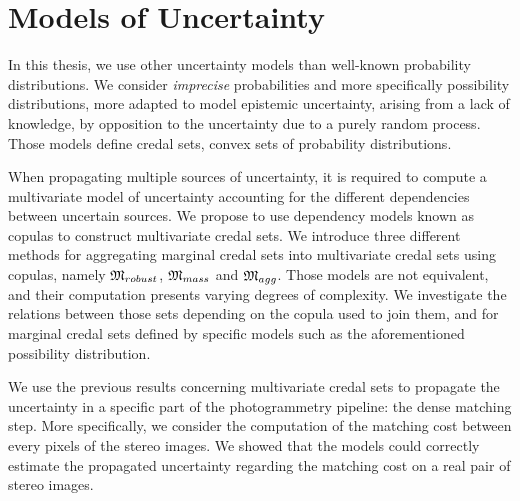 \section*{Models of Uncertainty}
In this thesis, we use other uncertainty models than well-known probability distributions. We consider \textit{imprecise} probabilities and more specifically possibility distributions, more adapted to model epistemic uncertainty, \ie arising from a lack of knowledge, by opposition to the uncertainty due to a purely random process. Those models define credal sets, \ie convex sets of probability distributions. 

When propagating multiple sources of uncertainty, it is required to compute a multivariate model of uncertainty accounting for the different dependencies between uncertain sources. We propose to use dependency models known as copulas to construct multivariate credal sets. We introduce three different methods for aggregating marginal credal sets into multivariate credal sets using copulas, namely $\mathfrak{M}_{robust}$, $\mathfrak{M}_{mass}$ and $\mathfrak{M}_{agg}$. Those models are not equivalent, and their computation presents varying degrees of complexity. We investigate the relations between those sets depending on the copula used to join them, and for marginal credal sets defined by specific models such as the aforementioned possibility distribution.

We use the previous results concerning multivariate credal sets to propagate the uncertainty in a specific part of the photogrammetry pipeline: the dense matching step. More specifically, we consider the computation of the matching cost between every pixels of the stereo images. We showed that the models could correctly estimate the propagated uncertainty regarding the matching cost on a real pair of stereo images.

